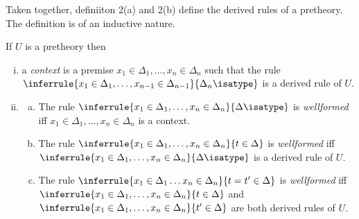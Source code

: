Taken together, definiiton 2(a) and 2(b) define the derived rules of a pretheory.
%
The definition is of an inductive nature.

\begin{definition}[2(a)]
  If $U$ is a pretheory  then
  \begin{enumerate}[(i)]
    \item  a \emph{context} is a premise $x_1\in\Delta_1,\ldots,x_n\in\Delta_n$ such that the rule $\inferrule{x_1\in\Delta_1,\ldots,x_{n-1}\in\Delta_{n-1}}{\Delta_n\isatype}$ is a derived rule of $U$.
    \item
      \begin{enumerate}[(a)]
        \item The rule $\inferrule{x_1\in\Delta_1,\ldots,x_n\in\Delta_n}{\Delta\isatype}$ is \emph{wellformed} iff $x_1\in\Delta_1,\ldots,x_n\in\Delta_n$ is a context.
        \item The rule $\inferrule{x_1\in\Delta_1,\ldots,x_n\in\Delta_n}{t\in\Delta}$ is \emph{wellformed} iff $\inferrule{x_1\in\Delta_1,\ldots,x_n\in\Delta_n}{\Delta\isatype}$ is a derived rule of $U$.
        \item {} The rule $\inferrule{x_1\in\Delta_1\ldots x_n\in\Delta_n}{t=t'\in\Delta}$ is \emph{wellformed} iff $\inferrule{x_1\in\Delta_1,\ldots,x_n\in\Delta_n}{t\in\Delta}$ and $\inferrule{x_1\in\Delta_1,\ldots,x_n\in\Delta_n}{t'\in\Delta}$ are both derived rules of $U$.
      \end{enumerate}
  \end{enumerate}
\end{definition}

